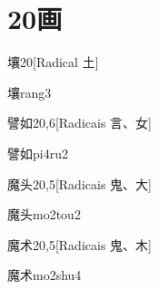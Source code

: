 
\section*{20画}

\begin{entry}{壤}{20}[Radical ⼟]
  \begin{phonetics}{壤}{rang3}
  \end{phonetics}
\end{entry}

\begin{entry}{譬如}{20,6}[Radicais ⾔、⼥]
  \begin{phonetics}{譬如}{pi4ru2}
  \end{phonetics}
\end{entry}

\begin{entry}{魔头}{20,5}[Radicais ⿁、⼤]
  \begin{phonetics}{魔头}{mo2tou2}
  \end{phonetics}
\end{entry}

\begin{entry}{魔术}{20,5}[Radicais ⿁、⽊]
  \begin{phonetics}{魔术}{mo2shu4}
  \end{phonetics}
\end{entry}



